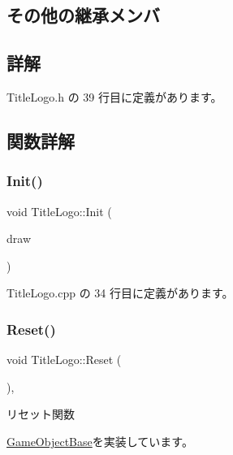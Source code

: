 \subsection*{その他の継承メンバ}


\subsection{詳解}


 Title\+Logo.\+h の 39 行目に定義があります。



\subsection{関数詳解}
\mbox{\label{class_title_logo_a1e07aae4771bd7a44cb7e3b55b72b9f3}} 
\subsubsection{\texorpdfstring{Init()}{Init()}}
{\footnotesize\ttfamily void Title\+Logo\+::\+Init (\begin{DoxyParamCaption}\item[{\mbox{\hyperlink{class_draw_base}{Draw\+Base}} $\ast$}]{draw }\end{DoxyParamCaption})}



 Title\+Logo.\+cpp の 34 行目に定義があります。

\mbox{\label{class_title_logo_a8bca39d06592b95b26024c2d86ac349c}} 
\subsubsection{\texorpdfstring{Reset()}{Reset()}}
{\footnotesize\ttfamily void Title\+Logo\+::\+Reset (\begin{DoxyParamCaption}{ }\end{DoxyParamCaption})\hspace{0.3cm}{\ttfamily [override]}, {\ttfamily [virtual]}}



リセット関数 



\mbox{\hyperlink{class_game_object_base_a85c59554f734bcb09f1a1e18d9517dce}{Game\+Object\+Base}}を実装しています。



